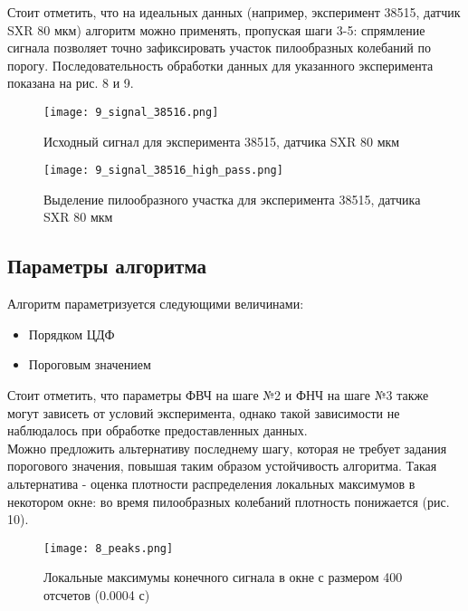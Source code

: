 \documentclass{report}
\begin{document}
Стоит отметить, что на идеальных данных (например, эксперимент 38515, датчик SXR 80 мкм) алгоритм можно применять, пропуская шаги 3-5: спрямление сигнала позволяет точно зафиксировать участок пилообразных колебаний по порогу. Последовательность обработки данных для указанного эксперимента показана на рис. 8 и 9.

\begin{figure}[H]
     \centering
     \captionsetup{justification=centering}
     \texttt{[image: 9\_signal\_38516.png]}
     \caption{Исходный сигнал для эксперимента 38515, датчика SXR 80 мкм}\label{Fig:Data1}
\end{figure}
\begin{figure}[H]
     \centering
     \captionsetup{justification=centering}
     \texttt{[image: 9\_signal\_38516\_high\_pass.png]}
     \caption{Выделение пилообразного участка для эксперимента 38515, датчика SXR 80 мкм}\label{Fig:Data1}
\end{figure}

\newpage

\subsection{Параметры алгоритма}

Алгоритм параметризуется следующими величинами:
\begin{itemize}
    \item Порядком ЦДФ
    \item Пороговым значением
\end{itemize}

Стоит отметить, что параметры ФВЧ на шаге №2 и ФНЧ на шаге №3 также могут зависеть от условий эксперимента, однако такой зависимости не наблюдалось при обработке предоставленных данных.
\\

Можно предложить альтернативу последнему шагу, которая не требует задания порогового значения, повышая таким образом устойчивость алгоритма. Такая альтернатива - оценка плотности распределения локальных максимумов в некотором окне: во время пилообразных колебаний плотность понижается (рис. 10).
\begin{figure}[H]
     \centering
     \captionsetup{justification=centering}
     \texttt{[image: 8\_peaks.png]}
     \caption{Локальные максимумы конечного сигнала в окне с размером 400 отсчетов (0.0004 с)}\label{Fig:Data1}
\end{figure}
\end{document}
